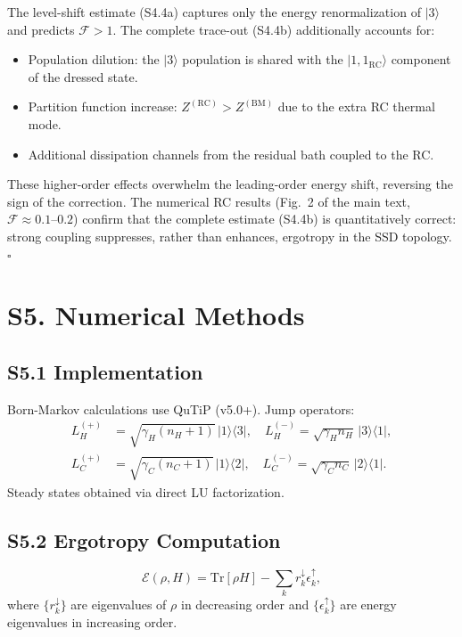 \documentclass[prl,twocolumn,superscriptaddress,amsmath,amssymb]{revtex4-2}
\begin{document}
The level-shift estimate (S4.4a) captures only the energy renormalization of $|3\rangle$ and predicts $\mathcal{F} > 1$. The complete trace-out (S4.4b) additionally accounts for:
\begin{itemize}
\item Population dilution: the $|3\rangle$ population is shared with the $|1,1_{\mathrm{RC}}\rangle$ component of the dressed state.
\item Partition function increase: $Z^{(\mathrm{RC})} > Z^{(\mathrm{BM})}$ due to the extra RC thermal mode.
\item Additional dissipation channels from the residual bath coupled to the RC.
\end{itemize}
These higher-order effects overwhelm the leading-order energy shift, reversing the sign of the correction. The numerical RC results (Fig.~2 of the main text, $\mathcal{F} \approx 0.1$--$0.2$) confirm that the complete estimate (S4.4b) is quantitatively correct: strong coupling suppresses, rather than enhances, ergotropy in the SSD topology. $\square$

\section{S5. Numerical Methods}

\subsection{S5.1 Implementation}

Born-Markov calculations use QuTiP (v5.0+). Jump operators:
\begin{align}
L_H^{(+)} &= \sqrt{\gamma_H(n_H+1)}\,|1\rangle\langle3|, \quad L_H^{(-)} = \sqrt{\gamma_H n_H}\,|3\rangle\langle1|, \\
L_C^{(+)} &= \sqrt{\gamma_C(n_C+1)}\,|1\rangle\langle2|, \quad L_C^{(-)} = \sqrt{\gamma_C n_C}\,|2\rangle\langle1|.
\end{align}
Steady states obtained via direct LU factorization.

\subsection{S5.2 Ergotropy Computation}

\begin{equation}
\mathcal{E}(\rho, H) = \mathrm{Tr}[\rho H] - \sum_k r_k^\downarrow \epsilon_k^\uparrow,
\end{equation}
where $\{r_k^\downarrow\}$ are eigenvalues of $\rho$ in decreasing order and $\{\epsilon_k^\uparrow\}$ are energy eigenvalues in increasing order.
\end{document}
